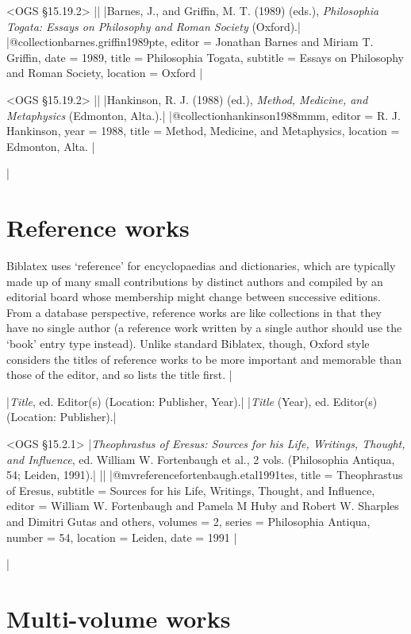 \documentclass[extrafontsizes,11pt,a4paper,oneside]{memoir}
\newcommand*{\lit}[1]{\textsf{#1}}
\newcommand*{\code}[1]{`\textsf{#1}'}
\begin{document}
\bibexample<OGS \S15.19.2>
||%
|Barnes, J., and Griffin, M. T. (1989) (eds.), \emph{Philosophia Togata: Essays on Philosophy and Roman Society} (Oxford).|%
|@collection{barnes.griffin1989pte,
  editor = {Jonathan Barnes and Miriam T. Griffin},
  date = {1989},
  title = {Philosophia Togata},
  subtitle = {Essays on Philosophy and Roman Society},
  location = {Oxford}
}|%

\bibexample<OGS \S15.19.2>
||%
|Hankinson, R. J. (1988) (ed.), \emph{Method, Medicine, and Metaphysics} (Edmonton, Alta.).|%
|@collection{hankinson1988mmm,
  editor = {R. J. Hankinson},
  year = {1988},
  title = {Method, Medicine, and Metaphysics},
  location = {Edmonton, Alta.}
}|

\todoc|
\section{Reference works}

Biblatex uses \code{reference} for encyclopaedias and dictionaries, which are typically made up of many small contributions by distinct authors and compiled by an editorial board whose membership might change between successive editions. From a database perspective, reference works are like collections in that they have no single author (a reference work written by a single author should use the \code{book} entry type instead). Unlike standard Biblatex, though, Oxford style considers the titles of reference works to be more important and memorable than those of the editor, and so lists the title first.
|

\specs
|\emph{Title}, \lit{ed.} Editor(s) (Location: Publisher, Year).|%
|\emph{Title} (Year), \lit{ed.} Editor(s) (Location: Publisher).|

\bibexample<OGS \S15.2.1>
|\emph{Theophrastus of Eresus: Sources for his Life, Writings, Thought, and Influence}, ed. William W. Fortenbaugh et al., 2 vols. (Philosophia Antiqua, 54; Leiden, 1991).|%
||%
|@mvreference{fortenbaugh.etal1991tes,
  title = {{Theophrastus} of {Eresus}},
  subtitle = {Sources for his Life, Writings, Thought, and Influence},
  editor = {William W. Fortenbaugh and Pamela M Huby and Robert W. Sharples and Dimitri Gutas and others},
  volumes = {2},
  series = {Philosophia Antiqua},
  number = {54},
  location = {Leiden},
  date = {1991}
}|

\todoc|
\section{Multi-volume works}
\end{document}
